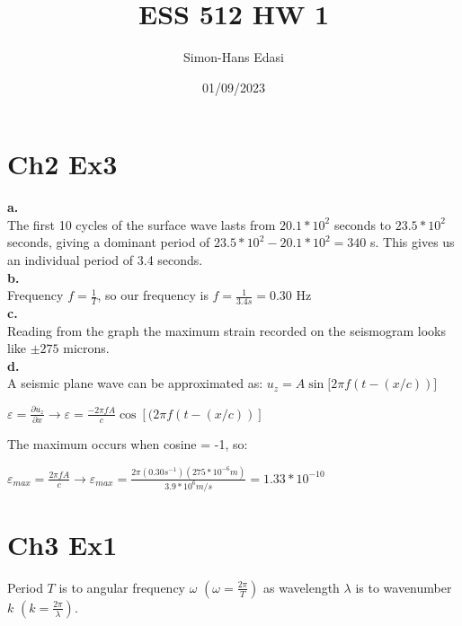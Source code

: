 \documentclass{article}
\title{ESS 512 HW 1}
\date{01/09/2023}
\author{Simon-Hans Edasi}
\begin{document}
	\maketitle



\section{Ch2 Ex3}
\textbf{a.} \\
The first 10 cycles of the surface wave lasts from $20.1 * 10^2$ seconds to $23.5*10^2$ seconds, giving a dominant period of $23.5 * 10^2 - 20.1 * 10^2 = 340$ s. This gives us an individual period of 3.4 seconds. \\

\textbf{b.} \\
Frequency $f = \frac{1}{T}$, so our frequency is $f = \frac{1}{3.4s} = 0.30$ Hz \\

\textbf{c.}\\
Reading from the graph the maximum strain recorded on the seismogram looks like $\pm{275}$ microns. \\

\textbf{d.}\\
A seismic plane wave can be approximated as: $u_{z} = A \sin[{2\pi f(t - (x / c))]}$ \\

\begin{center}

$
\varepsilon = \frac{\partial{u_z}}{\partial{x}} \rightarrow \varepsilon = \frac{- 2  \pi f A}{c}\cos \left[(2\pi f \left(t - \left(x / c\right)\right) \right]
$
\end{center}

The maximum occurs when cosine = -1, so:

\begin{center}
$
\varepsilon_{max} = \frac{2  \pi f A}{c} \rightarrow \varepsilon_{max} = \frac{2\pi \left( 0.30 s^{-1}\right)\left( 275 * 10^{-6} m\right)}{3.9 * 10^{6} m/s} = 1.33 * 10^{-10}
$
\end{center}





 



\section{Ch3 Ex1}
Period $T$ is to angular frequency $\omega$ $\left(\omega = \frac{2\pi}{T}\right)$ as wavelength $\lambda$ is to wavenumber $k$ $\left(k = \frac{2\pi}{\lambda}\right)$.
\end{document}
